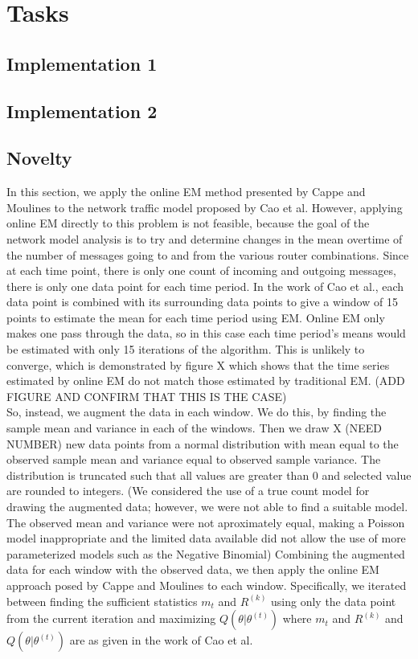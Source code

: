 \documentclass[12pt]{article}
\begin{document}
\section{Tasks}
\subsection{Implementation 1}

\subsection{Implementation 2}

\newpage
\subsection{Novelty}
In this section, we apply the online EM method presented by Cappe and Moulines to the network traffic model proposed by Cao et al. However, applying online EM directly to this problem is not feasible, because the goal of the network model analysis is to try and determine changes in the mean overtime of  the number of messages going to and from the various router combinations.  Since at each time point, there is only one count of incoming and outgoing messages, there is only one data point for each time period. In the work of Cao et al., each data point is combined with its surrounding data points to give a window of 15 points to estimate the mean for each time period using EM. Online EM only makes one pass through the data, so in this case each time period's means would be estimated with only 15 iterations of the algorithm. This is unlikely to converge, which is demonstrated by figure X which shows that the time series estimated by online EM do not match those estimated by traditional EM.  (ADD FIGURE AND CONFIRM THAT THIS IS THE CASE)\\

So, instead, we augment the data in each window. We do this, by finding the sample mean and variance in each of the windows. Then we draw X (NEED NUMBER) new data points from a normal distribution with mean equal to the observed sample mean and variance equal to observed sample variance. The distribution is truncated such that all values are greater than 0 and selected value are rounded to integers. (We considered the use of a true count model for drawing the augmented data; however, we were not able to find a suitable model. The observed mean and variance were not aproximately equal, making a Poisson model inappropriate and the limited data available did not allow the use of more parameterized models such as the Negative Binomial) Combining the augmented data for each window with the observed data, we then apply the online EM approach posed by Cappe and Moulines to each window. Specifically, we iterated between finding the sufficient statistics $m_{t}$ and $R^{(k)}$ using only the data point from the current iteration and maximizing $Q(\theta | \theta^{(t)})$ where $m_{t}$ and $R^{(k)}$ and  $Q(\theta | \theta^{(t)})$ are as given in the work of Cao et al.\\
\end{document}

